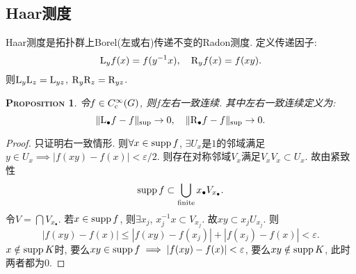 \documentclass{ctexart}
\makeatletter
\newcommand\<{\@ifstar\@angle@star\@angle@nostar}
\newtheorem{prop}{{\scshape Proposition}}[section]
\def\Cc{C_{\textup{c}}^\infty}
\def\supp{\mathop{\textup{supp}}}
\makeatother
\begin{document}
\subsection{Haar测度}
Haar测度是拓扑群上Borel(左或右)传递不变的Radon测度. 定义传递因子:
\[\mathrm{L}_y f(x)=f(y^{-1} x),\quad \mathrm{R}_yf(x)=f(xy).\]
则$\mathrm{L}_y\mathrm{L}_z=\mathrm{L}_{yz}$, $\mathrm{R}_y\mathrm{R}_z=\mathrm{R}_{yz}$.
\begin{prop}
    令$f\in \Cc(G)$, 则$f$左右一致连续. 其中左右一致连续定义为:
    \[\|\mathrm{L}_\bullet f-f\|_{\sup}\to 0,\quad \|\mathrm{R}_\bullet f-f\|_{\sup}\to 0.\]
\end{prop}
\begin{proof}
    只证明右一致情形. 则$\forall x\in \supp f$, $\exists U_x$是$1$的邻域满足$y\in U_x\implies |f(xy)-f(x)|<\varepsilon /2$. 则存在对称邻域$V_x$满足$V_x V_x\subset U_x$. 故由紧致性
    \[\supp f\subset \bigcup_{\text{finite}} x_\bullet V_{x_\bullet}.\]
    令$V=\bigcap V_{x_\bullet}$. 若$x\in\supp f$, 则$\exists x_j$, $x_j^{-1} x\subset V_{x_j}$. 故$xy\subset x_jU_{x_j}$. 则
    \[|f(xy)-f(x)|\leqslant |f(xy)-f(x_j)|+|f(x_j)-f(x)|<\varepsilon.\]
    $x\notin\supp K$时, 要么$xy\in\supp f\implies |f(xy)-f(x)|<\varepsilon$, 要么$xy\notin \supp K$, 此时两者都为$0$.
\end{proof}
\end{document}

